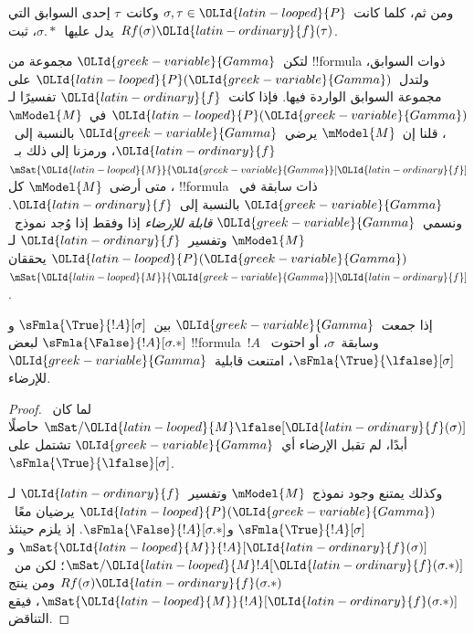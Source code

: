 \documentclass[../../../include/open-logic-section]{subfiles}
\begin{document}
ومن ثم، كلما كانت~$\sigma,\tau\in \OLId{latin-looped}{P}$ وكانت~$\tau$ إحدى السوابق التي
يدل عليها~$\sigma.{*}$، ثبت~$Rf(\sigma)\OLId{latin-ordinary}{f}(\tau)$.

\begin{defn}
  لتكن~$\OLId{greek-variable}{Gamma}$ مجموعة من !!{formula} ذوات السوابق، ولتدل~$\OLId{latin-looped}{P}(\OLId{greek-variable}{Gamma})$
  على مجموعة السوابق الواردة فيها. فإذا كانت~$\OLId{latin-ordinary}{f}$ تفسيرًا لـ$\OLId{latin-looped}{P}(\OLId{greek-variable}{Gamma})$
  في~$\mModel{M}$، قلنا إن~$\mModel{M}$ يرضي~$\OLId{greek-variable}{Gamma}$ بالنسبة إلى~$\OLId{latin-ordinary}{f}$،
  ورمزنا إلى ذلك بـ~$\mSat{\OLId{latin-looped}{M}}{\OLId{greek-variable}{Gamma}}[\OLId{latin-ordinary}{f}]$، متى أرضى~$\mModel{M}$ كل
  !!{formula} ذات سابقة في~$\OLId{greek-variable}{Gamma}$ بالنسبة إلى~$\OLId{latin-ordinary}{f}$. ونسمي~$\OLId{greek-variable}{Gamma}$
  \emph{قابلة للإرضاء} إذا وفقط إذا وُجد نموذج~$\mModel{M}$ وتفسير~$\OLId{latin-ordinary}{f}$
  لـ$\OLId{latin-looped}{P}(\OLId{greek-variable}{Gamma})$ يحققان~$\mSat{\OLId{latin-looped}{M}}{\OLId{greek-variable}{Gamma}}[\OLId{latin-ordinary}{f}]$.
\end{defn}

\begin{prop}
  إذا جمعت~$\OLId{greek-variable}{Gamma}$ بين~$\sFmla{\True}{!A}[\sigma]$
  و$\sFmla{\False}{!A}[\sigma.{*}]$ لبعض !!{formula}~$!A$
  وسابقة~$\sigma$، أو احتوت~$\sFmla{\True}{\lfalse}[\sigma]$،
  امتنعت قابلية~$\OLId{greek-variable}{Gamma}$ للإرضاء.
\end{prop}

\begin{proof}
  لما كان~$\mSat/{\OLId{latin-looped}{M}}{\lfalse}[\OLId{latin-ordinary}{f}(\sigma)]$ حاصلًا أبدًا، لم تقبل
  الإرضاء أي~$\OLId{greek-variable}{Gamma}$ تشتمل على~$\sFmla{\True}{\lfalse}[\sigma]$.

  وكذلك يمتنع وجود نموذج~$\mModel{M}$ وتفسير~$\OLId{latin-ordinary}{f}$ لـ$\OLId{latin-looped}{P}(\OLId{greek-variable}{Gamma})$
  يرضيان معًا~$\sFmla{\True}{!A}[\sigma]$
  و$\sFmla{\False}{!A}[\sigma.{*}]$. إذ يلزم حينئذ
  $\mSat{\OLId{latin-looped}{M}}{!A}[\OLId{latin-ordinary}{f}(\sigma)]$ و$\mSat/{\OLId{latin-looped}{M}}{!A}[\OLId{latin-ordinary}{f}(\sigma.{*})]$؛
  لكن من~$Rf(\sigma)\OLId{latin-ordinary}{f}(\sigma.{*})$ ومن
   ينتج
  $\mSat{\OLId{latin-looped}{M}}{!A}[\OLId{latin-ordinary}{f}(\sigma.{*})]$، فيقع التناقض.
\end{proof}
\end{document}
